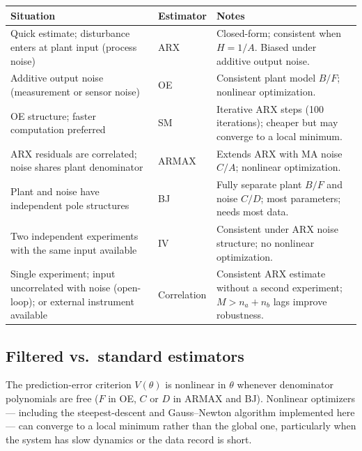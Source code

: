 \documentclass[11pt,a4paper]{article}
\begin{document}
\vspace{0.5em}
\begin{center}
\begin{tabular}{p{}p{}p{}}
  \toprule
  Situation & Estimator & Notes \\
  \midrule
  Quick estimate; disturbance enters at plant input (process noise) &
  ARX &
  Closed-form; consistent when $H = 1/A$.
  Biased under additive output noise. \\
  \addlinespace
  Additive output noise (measurement or sensor noise) &
  OE &
  Consistent plant model $B/F$; nonlinear optimization. \\
  \addlinespace
  OE structure; faster computation preferred &
  SM &
  Iterative ARX steps (100 iterations); cheaper but may
  converge to a local minimum. \\
  \addlinespace
  ARX residuals are correlated; noise shares plant denominator &
  ARMAX &
  Extends ARX with MA noise $C/A$; nonlinear optimization. \\
  \addlinespace
  Plant and noise have independent pole structures &
  BJ &
  Fully separate plant $B/F$ and noise $C/D$;
  most parameters; needs most data. \\
  \addlinespace
  Two independent experiments with the same input available &
  IV &
  Consistent under ARX noise structure;
  no nonlinear optimization. \\
  \addlinespace
  Single experiment; input uncorrelated with noise (open-loop);
  or external instrument available &
  Correlation &
  Consistent ARX estimate without a second experiment;
  $M > n_a + n_b$ lags improve robustness. \\
  \bottomrule
\end{tabular}
\end{center}

\subsection{Filtered vs.\ standard estimators}

The prediction-error criterion $V(\theta)$ is nonlinear in $\theta$
whenever denominator polynomials are free ($F$ in OE, $C$ or $D$
in ARMAX and BJ).  Nonlinear optimizers — including the
steepest-descent and Gauss--Newton algorithm implemented here —
can converge to a local minimum rather than the global one,
particularly when the system has slow dynamics or the data record
is short.
\end{document}
